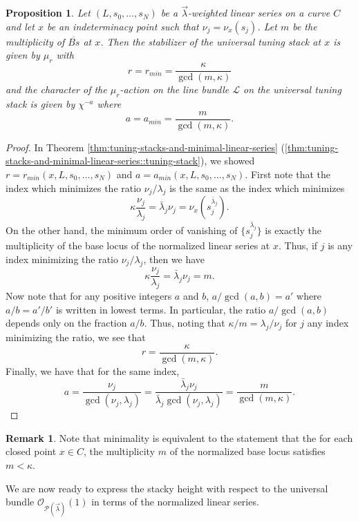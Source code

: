 \documentclass[a4paper,12pt]{amsart}
\newtheorem{prop}[thm]{Proposition}
\theoremstyle{definition}
\newtheorem{rmk}[thm]{Remark}
\newcommand{\cO}{\mathcal{O}}
\newcommand{\cL}{\mathcal{L}}
\newcommand{\blambda}{\bar{\lambda}}
\newcommand{\Pcv}{\mathcal{P}(\vec{\lambda})}
\begin{document}
	\begin{prop}\label{prop:normalized:local:conditions}
		Let $(L, s_0, \ldots, s_N)$ be a $\vec{\lambda}$-weighted linear series on a curve $C$ and let $x$ be an indeterminacy point such that $\nu_j = \nu_x(s_j)$. Let $m$ be the multiplicity of $\overline{Bs}$
		at $x$. Then the stabilizer of the universal tuning stack at $x$ is given by $\mu_r$ with
		$$
		r = r_{min} = \frac{\kappa}{\gcd(m, \kappa)}
		$$
		and the character of the $\mu_r$-action on the line bundle $\cL$ on the universal tuning stack is given by $\chi^{-a}$ where 
		$$
		a = a_{min} = \frac{m}{\gcd(m, \kappa)}. 
		$$
	\end{prop}
	\begin{proof} In Theorem \ref{thm:tuning-stacks-and-minimal-linear-series} (\ref{thm:tuning-stacks-and-minimal-linear-series::tuning-stack}), we showed $r = r_{min}(x, L, s_0, \ldots, s_N)$ and $a = a_{min}(x, L, s_0, \ldots, s_N)$. First note that the index which minimizes the ratio $\nu_j/\lambda_j$ is the same as the index which minimizes
		$$
		\kappa \frac{\nu_j}{\lambda_j} = \blambda_j \nu_j = \nu_x(s_j^{\blambda_j}). 
		$$
		On the other hand, the minimum order of vanishing of $\{s_j^{\blambda_j}\}$ is exactly the multiplicity of the base locus of the normalized linear series at $x$. Thus, if $j$ is any index minimizing the ratio $\nu_j/\lambda_j$, then we have
		$$
		\kappa \frac{\nu_j}{\lambda_j} = \blambda_j \nu_j = m. 
		$$
		Now note that for any positive integers $a$ and $b$, $a/\gcd(a,b) = a'$ where $a/b = a'/b'$ is written in lowest terms. In particular, the ratio $a/\gcd(a,b)$ depends only on the fraction $a/b$. Thus, noting that $\kappa/m = \lambda_j/\nu_j$ for $j$ any index minimizing the ratio, we see that
		$$
		r = \frac{\kappa}{\gcd(m, \kappa)}. 
		$$
		Finally, we have that for the same index,
		$$
		a = \frac{\nu_j}{\gcd(\nu_j, \lambda_j)} = \frac{\blambda_j \nu_j}{\blambda_j \gcd(\nu_j, \lambda_j)} = \frac{m}{\gcd(m, \kappa)}. 
		$$
	\end{proof} 
	\begin{rmk} Note that minimality is equivalent to the statement that the for each closed point $x \in C$, the multiplicity $m$ of the normalized base locus satisfies $m < \kappa$. 
	\end{rmk}
	
	We are now ready to express the stacky height with respect to the universal bundle $\cO_{\Pcv}(1)$ in terms of the normalized linear series. 
	
\end{document}

